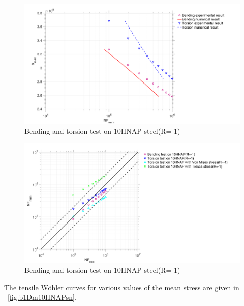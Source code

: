 \documentclass[3p,times,number,review]{elsarticle}
\newcommand{\figref}[1]{\figurename~\ref{#1}}
\begin{document}
\begin{figure}[!h]
	\centering
	\includegraphics[width=\textwidth]{figures//bt1D_10HNAP_sn.png} 
	\caption{Bending and torsion test on 10HNAP steel(R=-1)}
	\label{fig.bt1D10HNAPsn}
\end{figure}
\begin{figure}[!h]
	\centering
	\includegraphics[width=\textwidth]{figures//bt1D_10HNAP_err1.png} 
	\caption{Bending and torsion test on 10HNAP steel(R=-1)}
	\label{fig.bt1D10HNAPerr1}
\end{figure}

The tensile Wöhler curves for various values of the mean stress are given in \figref{fig.b1Dm10HNAPsn}.
\end{document}
